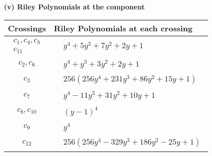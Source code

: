 \documentclass[1p]{elsarticle_modified}
\theoremstyle{definition}
\begin{document}
\newpage\renewcommand{\arraystretch}{1}
\flushleft \textbf{(v) Riley Polynomials at the component}\newline \\
\begin{tabular}{m{50pt}|m{274pt}}
Crossings & \hspace{64pt}Riley Polynomials at each crossing \\
\hline $$\begin{aligned}c_{1},c_{4},c_{5}\\c_{11}\end{aligned}$$&$\begin{aligned}
&y^4+5 y^3+7 y^2+2 y+1
\end{aligned}$\\
\hline $$\begin{aligned}c_{2},c_{6}\end{aligned}$$&$\begin{aligned}
&y^4+y^3+3 y^2+2 y+1
\end{aligned}$\\
\hline $$\begin{aligned}c_{3}\end{aligned}$$&$\begin{aligned}
&256(256 y^4+231 y^3+86 y^2+15 y+1)
\end{aligned}$\\
\hline $$\begin{aligned}c_{7}\end{aligned}$$&$\begin{aligned}
&y^4-11 y^3+31 y^2+10 y+1
\end{aligned}$\\
\hline $$\begin{aligned}c_{8},c_{10}\end{aligned}$$&$\begin{aligned}
&(y-1)^4
\end{aligned}$\\
\hline $$\begin{aligned}c_{9}\end{aligned}$$&$\begin{aligned}
&y^4
\end{aligned}$\\
\hline $$\begin{aligned}c_{12}\end{aligned}$$&$\begin{aligned}
&256(256 y^4-329 y^3+186 y^2-25 y+1)
\end{aligned}$\\
\hline
\end{tabular}\\~\\
\end{document}

